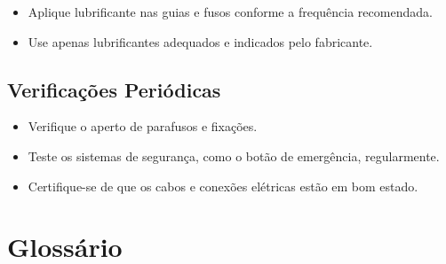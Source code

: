 \documentclass[twoside,a4paper]{refart}
\begin{document}
\begin{itemize} \item Aplique lubrificante nas guias e fusos conforme a frequência recomendada. \item Use apenas lubrificantes adequados e indicados pelo fabricante. \end{itemize}

\subsection{Verificações Periódicas}

\begin{itemize} \item Verifique o aperto de parafusos e fixações. \item Teste os sistemas de segurança, como o botão de emergência, regularmente. \item Certifique-se de que os cabos e conexões elétricas estão em bom estado. \end{itemize}

\section*{Glossário}
\end{document}
